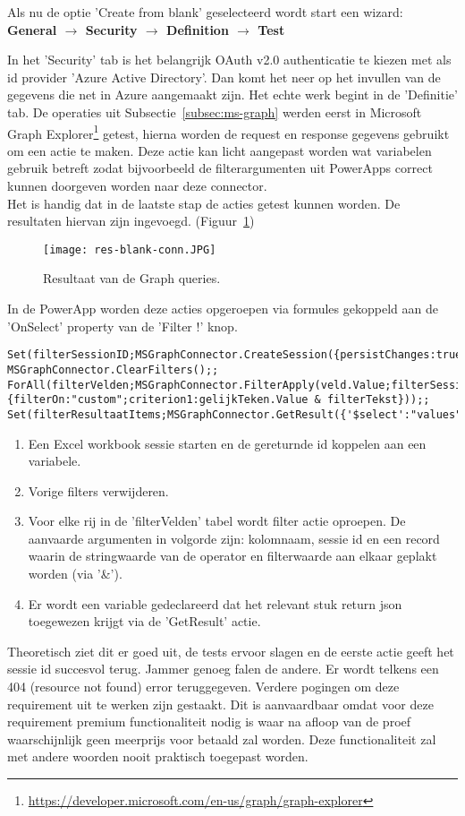 Als nu de optie 'Create from blank' geselecteerd wordt start een wizard:\\ 
\textbf{General $\rightarrow$ Security $\rightarrow$ Definition $\rightarrow$ Test}

In het 'Security' tab is het belangrijk OAuth v2.0 authenticatie te kiezen met als id provider 'Azure Active Directory'. Dan komt het neer op het invullen van de gegevens die net in Azure aangemaakt zijn. Het echte werk begint in de 'Definitie' tab. De operaties uit Subsectie~\ref{subsec:ms-graph} werden eerst in Microsoft Graph Explorer\footnote{\url{https://developer.microsoft.com/en-us/graph/graph-explorer}} getest, hierna worden de request en response gegevens gebruikt om een actie te maken. Deze actie kan licht aangepast worden wat variabelen gebruik betreft zodat bijvoorbeeld de filterargumenten uit PowerApps correct kunnen doorgeven worden naar deze connector.\\
Het is handig dat in de laatste stap de acties getest kunnen worden. De resultaten hiervan zijn ingevoegd. (Figuur~\ref{fig:res-blank-conn})

\begin{figure}[h!]
    \texttt{[image: res-blank-conn.JPG]}
    \caption{Resultaat van de Graph queries.}
    \label{fig:res-blank-conn}
\end{figure}

In de PowerApp worden deze acties opgeroepen via formules gekoppeld aan de 'OnSelect' property van de 'Filter !' knop.
\begin{lstlisting}
Set(filterSessionID;MSGraphConnector.CreateSession({persistChanges:true}).id);;
MSGraphConnector.ClearFilters();;
ForAll(filterVelden;MSGraphConnector.FilterApply(veld.Value;filterSessionID;{filterOn:"custom";criterion1:gelijkTeken.Value & filterTekst}));;
Set(filterResultaatItems;MSGraphConnector.GetResult({'$select':"values"}).value);;
\end{lstlisting}
\begin{enumerate}
    \item Een Excel workbook sessie starten en de gereturnde id koppelen aan een variabele.
    \item Vorige filters verwijderen.
    \item Voor elke rij in de 'filterVelden' tabel wordt filter actie oproepen. De aanvaarde argumenten in volgorde zijn: kolomnaam, sessie id en een record waarin de stringwaarde van de operator en filterwaarde aan elkaar geplakt worden (via '\&').
    \item Er wordt een variable gedeclareerd dat het relevant stuk return json toegewezen krijgt via de 'GetResult' actie.
\end{enumerate}

Theoretisch ziet dit er goed uit, de tests ervoor slagen en de eerste actie geeft het sessie id succesvol terug. Jammer genoeg falen de andere. Er wordt telkens een 404 (resource not found) error teruggegeven. Verdere pogingen om deze requirement uit te werken zijn gestaakt. Dit is aanvaardbaar omdat voor deze requirement premium functionaliteit nodig is waar na afloop van de proef waarschijnlijk geen meerprijs voor betaald zal worden. Deze functionaliteit zal met andere woorden nooit praktisch toegepast worden.